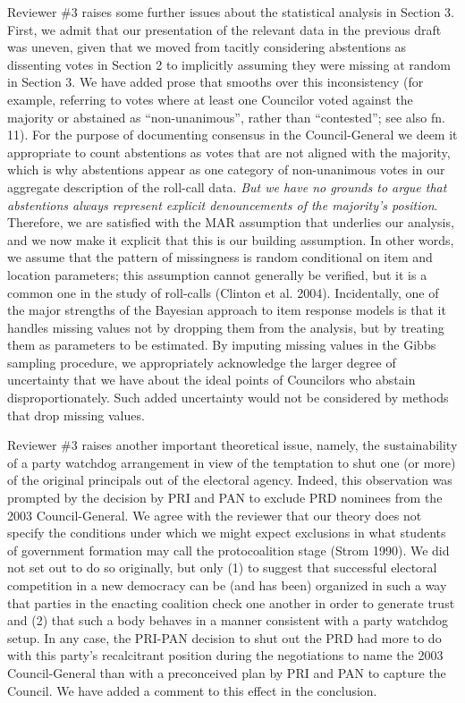 \documentclass[12pt]{article}
\begin{document}
Reviewer \#3 raises some further issues about the statistical
analysis in Section 3.  First, we admit that our presentation of the
relevant data in the previous draft was uneven, given that we moved
from tacitly considering abstentions as dissenting votes in Section
2 to implicitly assuming they were missing at random in Section 3.
We have added prose that smooths over this inconsistency (for
example, referring to votes where at least one Councilor voted
against the majority or abstained as ``non-unanimous'', rather than
``contested''; see also fn. 11).  For the purpose of documenting
consensus in the Council-General we deem it appropriate to count
abstentions as votes that are not aligned with the majority, which
is why abstentions appear as one category of non-unanimous votes in
our aggregate description of the roll-call data.  \emph{But we have
no grounds to argue that abstentions always represent explicit
denouncements of the majority's position}.  Therefore, we are
satisfied with the MAR assumption that underlies our analysis, and
we now make it explicit that this is our building assumption.  In
other words, we assume that the pattern of missingness is random
conditional on item and location parameters; this assumption cannot
generally be verified, but it is a common one in the study of
roll-calls (Clinton et al. 2004).  Incidentally, one of the major
strengths of the Bayesian approach to item response models is that
it handles missing values not by dropping them from the analysis,
but by treating them as parameters to be estimated.  By imputing
missing values in the Gibbs sampling procedure, we appropriately
acknowledge the larger degree of uncertainty that we have about the
ideal points of Councilors who abstain disproportionately.  Such
added uncertainty would not be considered by methods that drop
missing values.

Reviewer \#3 raises another important theoretical issue, namely, the
sustainability of a party watchdog arrangement in view of the
temptation to shut one (or more) of the original principals out of
the electoral agency.  Indeed, this observation was prompted by the
decision by PRI and PAN to exclude PRD nominees from the 2003
Council-General.  We agree with the reviewer that our theory does
not specify the conditions under which we might expect exclusions in
what students of government formation may call the protocoalition
stage (Strom 1990).  We did not set out to do so originally, but
only (1) to suggest that successful electoral competition in a new
democracy can be (and has been) organized in such a way that parties
in the enacting coalition check one another in order to generate
trust and (2) that such a body behaves in a manner consistent with a
party watchdog setup.  In any case, the PRI-PAN decision to shut out
the PRD had more to do with this party's recalcitrant position
during the negotiations to name the 2003 Council-General than with a
preconceived plan by PRI and PAN to capture the Council.  We have
added a comment to this effect in the conclusion.
\end{document}
